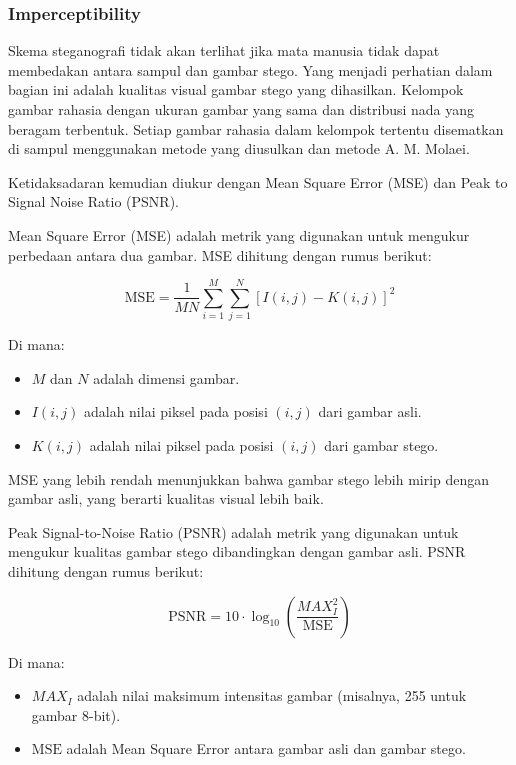 \documentclass{ittelkom}
\begin{document}
\subsubsection{Imperceptibility}

Skema steganografi tidak akan terlihat jika mata manusia tidak dapat membedakan
antara sampul dan gambar stego. Yang menjadi perhatian dalam bagian ini adalah
kualitas visual gambar stego yang dihasilkan. Kelompok gambar rahasia dengan
ukuran gambar yang sama dan distribusi nada yang beragam terbentuk. Setiap
gambar rahasia dalam kelompok tertentu disematkan di sampul menggunakan metode
yang diusulkan dan metode A. M. Molaei.

Ketidaksadaran kemudian diukur dengan Mean Square Error (MSE) dan Peak to
Signal Noise Ratio (PSNR).

Mean Square Error (MSE) adalah metrik yang digunakan untuk mengukur perbedaan
antara dua gambar. MSE dihitung dengan rumus berikut:

\begin{equation}
    \text{MSE} = \frac{1}{MN} \sum_{i=1}^{M} \sum_{j=1}^{N} [I(i,j) - K(i,j)]^2
\end{equation}

Di mana:
\begin{itemize}
    \item $M$ dan $N$ adalah dimensi gambar.
    \item $I(i,j)$ adalah nilai piksel pada posisi $(i,j)$ dari gambar asli.
    \item $K(i,j)$ adalah nilai piksel pada posisi $(i,j)$ dari gambar stego.
\end{itemize}

MSE yang lebih rendah menunjukkan bahwa gambar stego lebih mirip dengan gambar
asli, yang berarti kualitas visual lebih baik.

Peak Signal-to-Noise Ratio (PSNR) adalah metrik yang digunakan untuk mengukur
kualitas gambar stego dibandingkan dengan gambar asli. PSNR dihitung dengan
rumus berikut:

\begin{equation}
    \text{PSNR} = 10 \cdot \log_{10} \left( \frac{MAX_I^2}{\text{MSE}} \right)
\end{equation}

Di mana:
\begin{itemize}
    \item $MAX_I$ adalah nilai maksimum intensitas gambar (misalnya, 255 untuk gambar 8-bit).
    \item $\text{MSE}$ adalah Mean Square Error antara gambar asli dan gambar stego.
\end{itemize}
\end{document}
